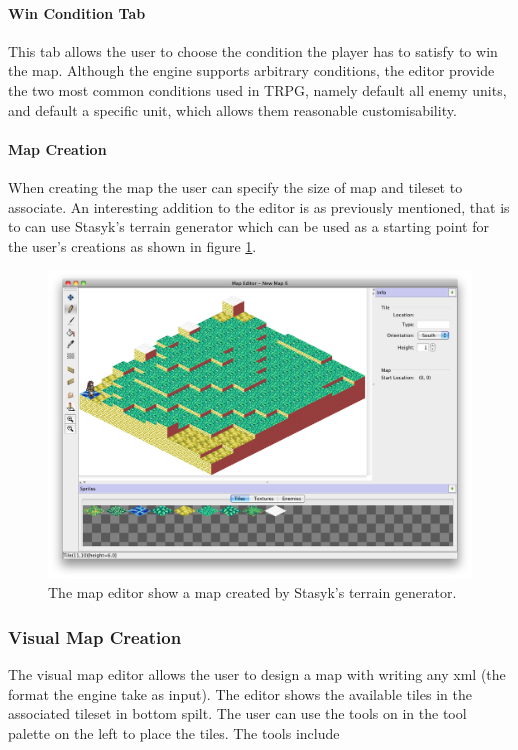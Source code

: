 \paragraph{Win Condition Tab\\}
This tab allows the user to choose the condition the player has to satisfy to win the map. Although the engine supports arbitrary conditions, the editor provide the two most common conditions used in TRPG, namely default all enemy units, and default a specific unit, which allows them  reasonable customisability.

\paragraph{Map Creation\\}
When creating the map the user can specify the size of map and tileset to associate.  An interesting addition to the editor is as previously  mentioned, that is to can use Stasyk's terrain generator which can be used as a starting point for the user's creations as shown in figure \ref{fig:figures_editor_gen}.

\begin{figure}[htbp]
	\centering
		\includegraphics[width=\textwidth]{figures/editor/gen.png}
	\caption{The map editor show a map created by Stasyk's terrain generator.}
	\label{fig:figures_editor_gen}
\end{figure}

\subsubsection{Visual Map Creation}
The visual map editor allows the user to design a map with writing any xml (the format the engine take as input).  The editor shows the available tiles in the associated tileset in bottom spilt.  The user can use the tools on in the tool palette on the left to place the tiles.  The tools include


